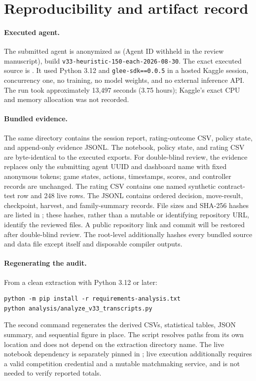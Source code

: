 \section{Reproducibility and artifact record}
\label{app:reproducibility}

\paragraph{Executed agent.}
The submitted agent is anonymized as \AgentName{} (Agent ID withheld in the
review manuscript), build
\texttt{v33-heuristic-150-each-2026-08-30}. The exact executed source is
.
It used Python 3.12 and \texttt{glee-sdk==0.0.5} in a hosted Kaggle session,
concurrency one, no training, no model weights, and no external inference API.
The run took approximately 13,497 seconds (3.75 hours); Kaggle's exact CPU and
memory allocation was not recorded.

\paragraph{Bundled evidence.}
The same directory contains the session report, rating-outcome CSV,
policy state, and append-only evidence JSONL. The notebook, policy state, and
rating CSV are byte-identical to the executed exports. For double-blind review,
the evidence replaces only the submitting agent UUID and dashboard name with
fixed anonymous tokens; game states, actions, timestamps, scores, and controller
records are unchanged. The rating CSV contains one named
synthetic contract-test row and 248 live rows. The JSONL contains ordered
decision, move-result, checkpoint, harvest, and family-summary records. File
sizes and SHA-256 hashes are listed in
; these hashes, rather than a
mutable or identifying repository URL, identify the reviewed files. A public
repository link and commit will be restored after double-blind review. The
root-level  additionally hashes every bundled
source and data file except itself and disposable compiler outputs.

\paragraph{Regenerating the audit.}
From a clean extraction with Python 3.12 or later:
\begin{verbatim}
python -m pip install -r requirements-analysis.txt
python analysis/analyze_v33_transcripts.py
\end{verbatim}
The second command regenerates the derived CSVs, statistical tables, JSON
summary, and sequential figure in place. The script resolves paths from its own
location and does not depend on the extraction directory name. The live
notebook dependency is separately pinned in ; live
execution additionally requires a valid competition credential and a mutable
matchmaking service, and is not needed to verify reported totals.

